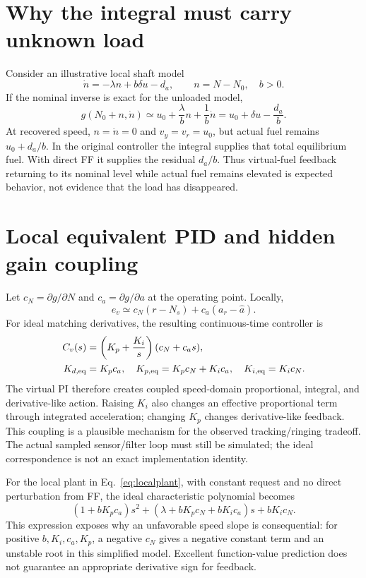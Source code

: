 \documentclass[11pt,a4paper,oneside]{report}
\begin{document}
\section{Why the integral must carry unknown load}
Consider an illustrative local shaft model
\begin{equation}
\dot n=-\lambda n+b\delta u-d_a,\qquad n=N-N_0,\quad b>0.
\label{eq:localplant}
\end{equation}
If the nominal inverse is exact for the unloaded model,
\begin{equation}
g(N_0+n,\dot n)\simeq u_0+\frac{\lambda}{b}n+\frac1b\dot n
=u_0+\delta u-\frac{d_a}{b}.
\end{equation}
At recovered speed, $n=\dot n=0$ and $v_y=v_r=u_0$, but actual fuel remains $u_0+d_a/b$. In the original controller the integral supplies that total equilibrium fuel. With direct FF it supplies the residual $d_a/b$. Thus virtual-fuel feedback returning to its nominal level while actual fuel remains elevated is expected behavior, not evidence that the load has disappeared.

\section{Local equivalent PID and hidden gain coupling}
Let $c_N=\partial g/\partial N$ and $c_a=\partial g/\partial a$ at the operating point. Locally,
\begin{equation}
e_v\simeq c_N(r-N_s)+c_a(a_r-\hat a).
\end{equation}
For ideal matching derivatives, the resulting continuous-time controller is
\begin{align}
C_v(s)&=\left(K_p+\frac{K_i}{s}\right)(c_N+c_as),\\
K_{d,\rm eq}&=K_pc_a,\quad
K_{p,\rm eq}=K_pc_N+K_ic_a,\quad
K_{i,\rm eq}=K_ic_N.
\label{eq:equivalent}
\end{align}
The virtual PI therefore creates coupled speed-domain proportional, integral, and derivative-like action. Raising $K_i$ also changes an effective proportional term through integrated acceleration; changing $K_p$ changes derivative-like feedback. This coupling is a plausible mechanism for the observed tracking/ringing tradeoff. The actual sampled sensor/filter loop must still be simulated; the ideal correspondence is not an exact implementation identity.

For the local plant in Eq.~\eqref{eq:localplant}, with constant request and no direct perturbation from FF, the ideal characteristic polynomial becomes
\begin{equation}
(1+bK_pc_a)s^2+(\lambda+bK_pc_N+bK_ic_a)s+bK_ic_N.
\label{eq:char}
\end{equation}
This expression exposes why an unfavorable speed slope is consequential: for positive $b,K_i,c_a,K_p$, a negative $c_N$ gives a negative constant term and an unstable root in this simplified model. Excellent function-value prediction does not guarantee an appropriate derivative sign for feedback.
\end{document}

